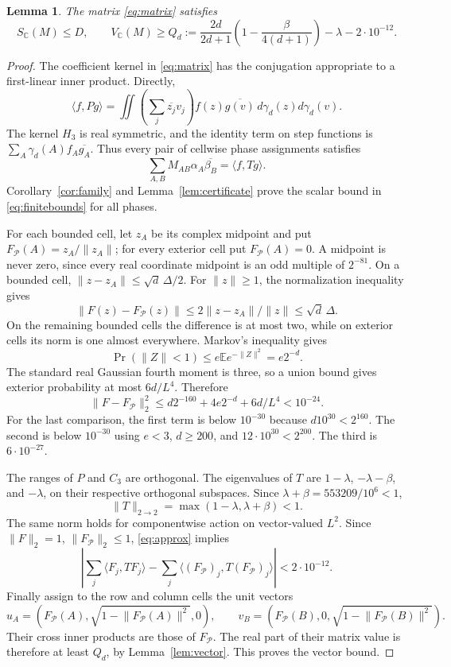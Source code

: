 \documentclass[11pt]{article}
\newtheorem{lemma}[theorem]{Lemma}
\theoremstyle{remark}\newtheorem{remark}[theorem]{Remark}
\newcommand{\C}{\mathbb C}
\newcommand{\E}{\mathbb E}
\newcommand{\ip}[2]{\langle #1,#2\rangle}
\newcommand{\norm}[1]{\lVert #1\rVert}
\begin{document}
\begin{lemma}\label{lem:finite}
The matrix \eqref{eq:matrix} satisfies
\begin{equation}\label{eq:finitebounds}
 S_{\C}(M)\le D,\qquad
 V_{\C}(M)\ge Q_d:=\frac{2d}{2d+1}
 \left(1-\frac{\beta}{4(d+1)}\right)-\lambda-2\cdot10^{-12}.
\end{equation}
\end{lemma}
\begin{proof}
The coefficient kernel in \eqref{eq:matrix} has the conjugation
appropriate to a first-linear inner product. Directly,
\[
 \ip{f}{Pg}=\iint\left(\sum_j\overline{z_j}v_j\right)
 f(z)\overline{g(v)}\,d\gamma_d(z)d\gamma_d(v).
\]
The kernel \(H_3\) is real symmetric, and the identity term on step
functions is \(\sum_A\gamma_d(A)f_A\overline{g_A}\).
Thus every pair of cellwise phase assignments satisfies
\[
 \sum_{A,B}M_{AB}\alpha_A\overline{\beta_B}=\ip{f}{Tg}.
\]
Corollary~\ref{cor:family} and Lemma~\ref{lem:certificate} prove
the scalar bound in \eqref{eq:finitebounds} for all phases.

For each bounded cell, let \(z_A\) be its complex midpoint and put
\(F_{\mathcal P}(A)=z_A/\norm{z_A}\); for every exterior cell put
\(F_{\mathcal P}(A)=0\). A midpoint is never zero, since every real
coordinate midpoint is an odd multiple of \(2^{-81}\).
On a bounded cell,
\(\norm{z-z_A}\le\sqrt d\,\Delta/2\). For \(\norm z\ge1\),
the normalization inequality gives
\[
 \norm{F(z)-F_{\mathcal P}(z)}
 \le2\norm{z-z_A}/\norm z\le\sqrt d\,\Delta.
\]
On the remaining bounded cells the difference is at most two, while
on exterior cells its norm is one almost everywhere. Markov's
inequality gives
\[
 \Pr(\norm Z<1)\le e\E e^{-\norm Z^2}=e2^{-d}.
\]
The standard real Gaussian fourth moment is three, so a union bound
gives exterior probability at most \(6d/L^4\). Therefore
\begin{equation}\label{eq:approx}
 \norm{F-F_{\mathcal P}}_2^2
 \le d2^{-160}+4e2^{-d}+6d/L^4<10^{-24}.
\end{equation}
For the last comparison, the first term is below \(10^{-30}\)
because \(d10^{30}<2^{160}\). The second is below \(10^{-30}\)
using \(e<3\), \(d\ge200\), and \(12\cdot10^{30}<2^{200}\).
The third is \(6\cdot10^{-27}\).

The ranges of \(P\) and \(C_3\) are orthogonal. The eigenvalues of
\(T\) are \(1-\lambda\), \(-\lambda-\beta\), and \(-\lambda\),
on their respective orthogonal subspaces. Since
\(\lambda+\beta=553209/10^6<1\),
\[
 \norm{T}_{2\to2}=\max(1-\lambda,\lambda+\beta)<1.
\]
The same norm holds for componentwise action on vector-valued
\(L^2\). Since \(\norm{F}_2=1\), \(\norm{F_{\mathcal P}}_2\le1\),
\eqref{eq:approx} implies
\[
 \left|\sum_j\ip{F_j}{TF_j}
 -\sum_j\ip{(F_{\mathcal P})_j}{T(F_{\mathcal P})_j}\right|
 <2\cdot10^{-12}.
\]
Finally assign to the row and column cells the unit vectors
\[
 u_A=\left(F_{\mathcal P}(A),
 \sqrt{1-\norm{F_{\mathcal P}(A)}^2},0\right),\qquad
 v_B=\left(F_{\mathcal P}(B),0,
 \sqrt{1-\norm{F_{\mathcal P}(B)}^2}\right).
\]
Their cross inner products are those of \(F_{\mathcal P}\).
The real part of their matrix value is therefore at least \(Q_d\),
by Lemma~\ref{lem:vector}. This proves the vector bound.
\end{proof}
\end{document}
